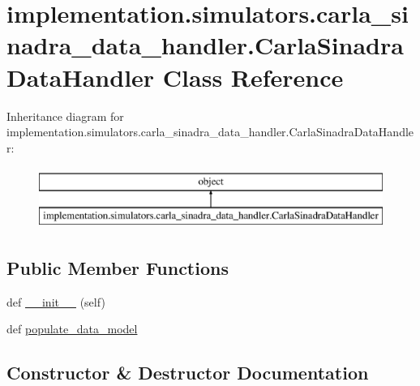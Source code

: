 \hypertarget{classimplementation_1_1simulators_1_1carla__sinadra__data__handler_1_1_carla_sinadra_data_handler}{}\section{implementation.\+simulators.\+carla\+\_\+sinadra\+\_\+data\+\_\+handler.\+Carla\+Sinadra\+Data\+Handler Class Reference}
\label{classimplementation_1_1simulators_1_1carla__sinadra__data__handler_1_1_carla_sinadra_data_handler}
Inheritance diagram for implementation.\+simulators.\+carla\+\_\+sinadra\+\_\+data\+\_\+handler.\+Carla\+Sinadra\+Data\+Handler\+:\begin{figure}[H]
\begin{center}
\leavevmode
\includegraphics[height=2.000000cm]{classimplementation_1_1simulators_1_1carla__sinadra__data__handler_1_1_carla_sinadra_data_handler}
\end{center}
\end{figure}
\subsection*{Public Member Functions}
\begin{DoxyCompactItemize}
\item 
def \hyperlink{classimplementation_1_1simulators_1_1carla__sinadra__data__handler_1_1_carla_sinadra_data_handler_a72fd74b953ea679883a720ba612136ab}{\+\_\+\+\_\+init\+\_\+\+\_\+} (self)
\item 
def \hyperlink{classimplementation_1_1simulators_1_1carla__sinadra__data__handler_1_1_carla_sinadra_data_handler_aa506562e73fc5609b024ea59e253943a}{populate\+\_\+data\+\_\+model}
\end{DoxyCompactItemize}


\subsection{Constructor \& Destructor Documentation}
\mbox{\label{classimplementation_1_1simulators_1_1carla__sinadra__data__handler_1_1_carla_sinadra_data_handler_a72fd74b953ea679883a720ba612136ab}} 
